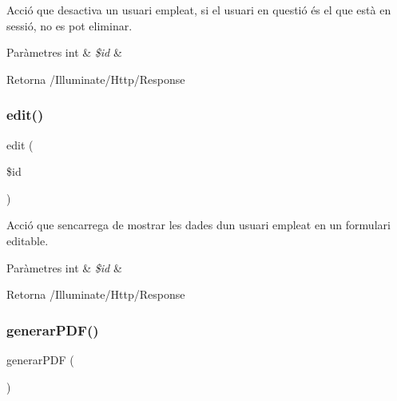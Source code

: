 Acció que desactiva un usuari empleat, si el usuari en questió és el que està en sessió, no es pot eliminar.


\begin{DoxyParams}[1]{Paràmetres}
int & {\em \$id} & \\
\hline
\end{DoxyParams}
\begin{DoxyReturn}{Retorna}
/\+Illuminate/\+Http/\+Response 
\end{DoxyReturn}
\mbox{\label{class_app_1_1_http_1_1_controllers_1_1_empleats_controller_a459ed16587e3a50b39b672c7e473abc5}} 
\subsubsection{\texorpdfstring{edit()}{edit()}}
{\footnotesize\ttfamily edit (\begin{DoxyParamCaption}\item[{}]{\$id }\end{DoxyParamCaption})}

Acció que s\textquotesingle{}encarrega de mostrar les dades d\textquotesingle{}un usuari empleat en un formulari editable.


\begin{DoxyParams}[1]{Paràmetres}
int & {\em \$id} & \\
\hline
\end{DoxyParams}
\begin{DoxyReturn}{Retorna}
/\+Illuminate/\+Http/\+Response 
\end{DoxyReturn}
\mbox{\label{class_app_1_1_http_1_1_controllers_1_1_empleats_controller_a3fb43ccec4eb67c487c799e63e78ebdc}} 
\subsubsection{\texorpdfstring{generar\+P\+D\+F()}{generarPDF()}}
{\footnotesize\ttfamily generar\+P\+DF (\begin{DoxyParamCaption}{ }\end{DoxyParamCaption})}

